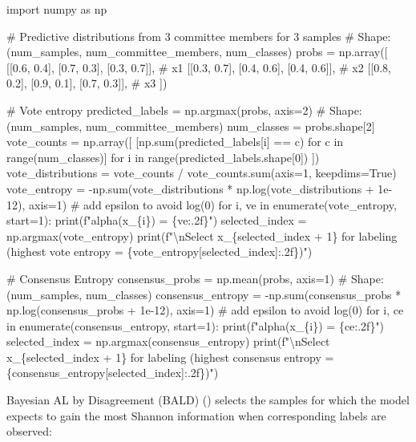 \documentclass[
  letterpaper,
  numbers=noenddot,
  DIV=11]{scrreprt}
\newenvironment{Shaded}{\begin{snugshade}}{\end{snugshade}}
\newcommand{\NormalTok}[1]{\textcolor[rgb]{0.00,0.23,0.31}{#1}}
\theoremstyle{plain}
\theoremstyle{definition}
\theoremstyle{remark}
\begin{document}
\begin{tcolorbox}[colframe=.grey, title=\faCode \enspace Code]

\begin{Shaded}
\begin{Highlighting}[numbers=left,,]
\NormalTok{import numpy as np}

\NormalTok{\# Predictive distributions from 3 committee members for 3 samples}
\NormalTok{\# Shape: (num\_samples, num\_committee\_members, num\_classes)}
\NormalTok{probs = np.array([}
\NormalTok{    [[0.6, 0.4], [0.7, 0.3], [0.3, 0.7]],  \# x1}
\NormalTok{    [[0.3, 0.7], [0.4, 0.6], [0.4, 0.6]],  \# x2}
\NormalTok{    [[0.8, 0.2], [0.9, 0.1], [0.7, 0.3]],  \# x3}
\NormalTok{])}

\NormalTok{\# Vote entropy}
\NormalTok{predicted\_labels = np.argmax(probs, axis=2)  \# Shape: (num\_samples, num\_committee\_members)}
\NormalTok{num\_classes = probs.shape[2]}
\NormalTok{vote\_counts = np.array([}
\NormalTok{    [np.sum(predicted\_labels[i] == c) for c in range(num\_classes)]}
\NormalTok{    for i in range(predicted\_labels.shape[0])}
\NormalTok{])}
\NormalTok{vote\_distributions = vote\_counts / vote\_counts.sum(axis=1, keepdims=True)}
\NormalTok{vote\_entropy = {-}np.sum(vote\_distributions * np.log(vote\_distributions + 1e{-}12), axis=1)  \# add epsilon to avoid log(0)}
\NormalTok{for i, ve in enumerate(vote\_entropy, start=1):}
\NormalTok{    print(f"alpha(x\_\{i\}) = \{ve:.2f\}")}
\NormalTok{selected\_index = np.argmax(vote\_entropy)}
\NormalTok{print(f"\textbackslash{}nSelect x\_\{selected\_index + 1\} for labeling (highest vote entropy = \{vote\_entropy[selected\_index]:.2f\})")}

\NormalTok{\# Consensus Entropy}
\NormalTok{consensus\_probs = np.mean(probs, axis=1)  \# Shape: (num\_samples, num\_classes)}
\NormalTok{consensus\_entropy = {-}np.sum(consensus\_probs * np.log(consensus\_probs + 1e{-}12), axis=1)  \# add epsilon to avoid log(0)}
\NormalTok{for i, ce in enumerate(consensus\_entropy, start=1):}
\NormalTok{    print(f"alpha(x\_\{i\}) = \{ce:.2f\}")}
\NormalTok{selected\_index = np.argmax(consensus\_entropy)}
\NormalTok{print(f"\textbackslash{}nSelect x\_\{selected\_index + 1\} for labeling (highest consensus entropy = \{consensus\_entropy[selected\_index]:.2f\})")}
\end{Highlighting}
\end{Shaded}

\end{tcolorbox}

Bayesian AL by Disagreement (BALD) () selects the samples for which the model expects to gain the
most Shannon information when corresponding labels are observed:
\end{document}
